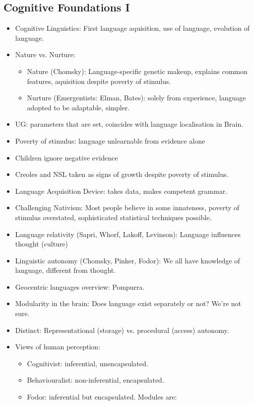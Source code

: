 \documentclass[11pt]{article}
\newenvironment{itemise}{
\begin{itemize}
  \setlength{\itemsep}{1pt}
  \setlength{\parskip}{0pt}
  \setlength{\parsep}{0pt}
}{\end{itemize}}
\begin{document}
\subsection{Cognitive Foundations I}
\begin{itemise}
 \item Cognitive Linguistics: First language aquisition, use of language, evolution of language.
 \item Nature vs. Nurture:
 \begin{itemise}
	\item Nature (Chomsky): Language-specific genetic makeup, explains common features, aquisition despite poverty of stimulus.
	\item Nurture (Emergentists: Elman, Bates): solely from experience, language adopted to be adaptable, simpler.
 \end{itemise}
 \item UG: parameters that are set, coincides with language localisation in Brain.
 \item Poverty of stimulus: language unlearnable from evidence alone
 \item Children ignore negative evidence
 \item Creoles and NSL taken as signs of growth despite poverty of stimulus.
 \item Language Acquisition Device: takes data, makes competent grammar.
 \item Challenging Nativism: Most people believe in some innateness, poverty of stimulus overstated, sophisticated statistical techniques possible.
 \item Language relativity (Sapri, Whorf, Lakoff, Levinson): Language influences thought (culture)
 \item Linguistic autonomy (Chomsky, Pinker, Fodor): We all have knowledge of language, different from thought.
 \item Geocentric languages overview: Pompurra.
 \item Modularity in the brain: Does language exist separately or not? We're not sure.
 \item Distinct: Representational (storage) vs. procedural (access)  autonomy.
 \item Views of human perception:
 \begin{itemise} 
 \item Cognitivist: inferential, unencapsulated. 
 \item Behaviouralist: non-inferential, encapsulated.
 \item Fodor: inferential but encapsulated. Modules are:

\end{itemise}
\end{itemise}
\end{document}
